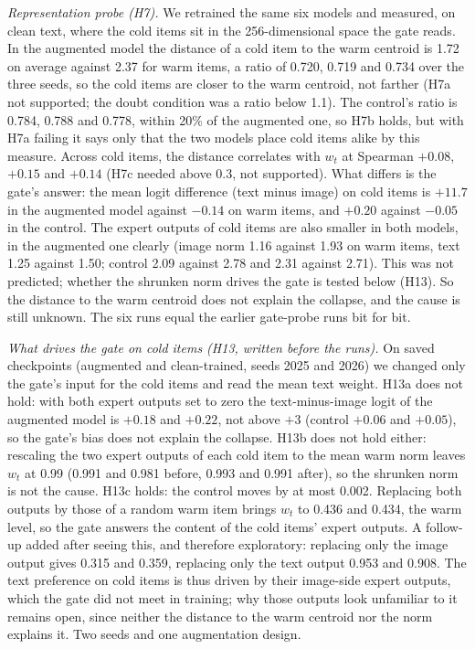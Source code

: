 \documentclass[conference]{IEEEtran}
\begin{document}
\emph{Representation probe (H7).} We retrained the same six models and measured, on clean text, where the cold items sit in the 256-dimensional space the gate reads. In the augmented model the distance of a cold item to the warm centroid is 1.72 on average against 2.37 for warm items, a ratio of 0.720, 0.719 and 0.734 over the three seeds, so the cold items are closer to the warm centroid, not farther (H7a not supported; the doubt condition was a ratio below 1.1). The control's ratio is 0.784, 0.788 and 0.778, within 20\% of the augmented one, so H7b holds, but with H7a failing it says only that the two models place cold items alike by this measure. Across cold items, the distance correlates with $w_t$ at Spearman $+0.08$, $+0.15$ and $+0.14$ (H7c needed above 0.3, not supported). What differs is the gate's answer: the mean logit difference (text minus image) on cold items is $+11.7$ in the augmented model against $-0.14$ on warm items, and $+0.20$ against $-0.05$ in the control. The expert outputs of cold items are also smaller in both models, in the augmented one clearly (image norm 1.16 against 1.93 on warm items, text 1.25 against 1.50; control 2.09 against 2.78 and 2.31 against 2.71). This was not predicted; whether the shrunken norm drives the gate is tested below (H13). So the distance to the warm centroid does not explain the collapse, and the cause is still unknown. The six runs equal the earlier gate-probe runs bit for bit.

\emph{What drives the gate on cold items (H13, written before the runs).} On saved checkpoints (augmented and clean-trained, seeds 2025 and 2026) we changed only the gate's input for the cold items and read the mean text weight. H13a does not hold: with both expert outputs set to zero the text-minus-image logit of the augmented model is $+0.18$ and $+0.22$, not above $+3$ (control $+0.06$ and $+0.05$), so the gate's bias does not explain the collapse. H13b does not hold either: rescaling the two expert outputs of each cold item to the mean warm norm leaves $w_t$ at 0.99 (0.991 and 0.981 before, 0.993 and 0.991 after), so the shrunken norm is not the cause. H13c holds: the control moves by at most 0.002. Replacing both outputs by those of a random warm item brings $w_t$ to 0.436 and 0.434, the warm level, so the gate answers the content of the cold items' expert outputs. A follow-up added after seeing this, and therefore exploratory: replacing only the image output gives 0.315 and 0.359, replacing only the text output 0.953 and 0.908. The text preference on cold items is thus driven by their image-side expert outputs, which the gate did not meet in training; why those outputs look unfamiliar to it remains open, since neither the distance to the warm centroid nor the norm explains it. Two seeds and one augmentation design.
\end{document}
